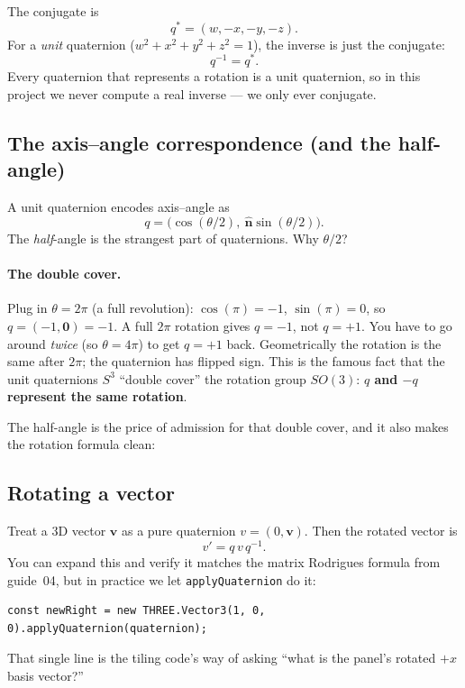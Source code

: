 \documentclass{article}
\begin{document}
The conjugate is
\[
  q^* = (w, -x, -y, -z).
\]
For a \emph{unit} quaternion ($w^2 + x^2 + y^2 + z^2 = 1$), the inverse is
just the conjugate:
\[
  q^{-1} = q^*.
\]
Every quaternion that represents a rotation is a unit quaternion, so in
this project we never compute a real inverse --- we only ever conjugate.

\subsection{The axis--angle correspondence (and the half-angle)}

A unit quaternion encodes axis--angle as
\[
  q = \bigl(\cos(\theta/2),\ \hat{\mathbf{n}} \sin(\theta/2)\bigr).
\]
The \emph{half}-angle is the strangest part of quaternions. Why $\theta/2$?

\paragraph{The double cover.} Plug in $\theta = 2\pi$ (a full
revolution): $\cos(\pi) = -1$, $\sin(\pi) = 0$, so
$q = (-1, \mathbf{0}) = -1$. A full $2\pi$ rotation gives $q = -1$, not
$q = +1$. You have to go around \emph{twice} (so $\theta = 4\pi$) to get
$q = +1$ back. Geometrically the rotation is the same after $2\pi$; the
quaternion has flipped sign. This is the famous fact that the unit
quaternions $S^3$ ``double cover'' the rotation group $SO(3)$:
\textbf{$q$ and $-q$ represent the same rotation}.

The half-angle is the price of admission for that double cover, and it
also makes the rotation formula clean:

\subsection{Rotating a vector}

Treat a 3D vector $\mathbf{v}$ as a pure quaternion $v = (0, \mathbf{v})$.
Then the rotated vector is
\[
  v' = q\, v\, q^{-1}.
\]
You can expand this and verify it matches the matrix Rodrigues formula
from guide~04, but in practice we let \texttt{applyQuaternion} do it:

\begin{lstlisting}
const newRight = new THREE.Vector3(1, 0, 0).applyQuaternion(quaternion);
\end{lstlisting}

That single line is the tiling code's way of asking ``what is the
panel's rotated $+x$ basis vector?''
\end{document}
